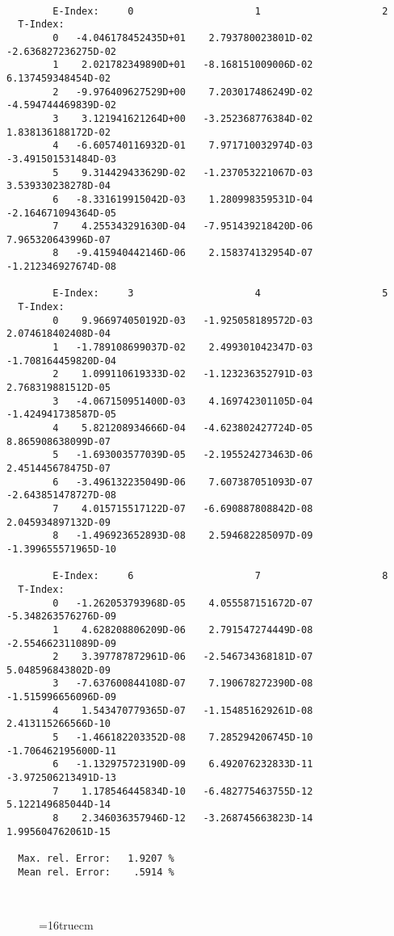 \documentclass[12pt]{article}
\begin{document}
\begin{small}\begin{verbatim}

        E-Index:     0                     1                     2
  T-Index:
        0   -4.046178452435D+01    2.793780023801D-02   -2.636827236275D-02
        1    2.021782349890D+01   -8.168151009006D-02    6.137459348454D-02
        2   -9.976409627529D+00    7.203017486249D-02   -4.594744469839D-02
        3    3.121941621264D+00   -3.252368776384D-02    1.838136188172D-02
        4   -6.605740116932D-01    7.971710032974D-03   -3.491501531484D-03
        5    9.314429433629D-02   -1.237053221067D-03    3.539330238278D-04
        6   -8.331619915042D-03    1.280998359531D-04   -2.164671094364D-05
        7    4.255343291630D-04   -7.951439218420D-06    7.965320643996D-07
        8   -9.415940442146D-06    2.158374132954D-07   -1.212346927674D-08

        E-Index:     3                     4                     5
  T-Index:
        0    9.966974050192D-03   -1.925058189572D-03    2.074618402408D-04
        1   -1.789108699037D-02    2.499301042347D-03   -1.708164459820D-04
        2    1.099110619333D-02   -1.123236352791D-03    2.768319881512D-05
        3   -4.067150951400D-03    4.169742301105D-04   -1.424941738587D-05
        4    5.821208934666D-04   -4.623802427724D-05    8.865908638099D-07
        5   -1.693003577039D-05   -2.195524273463D-06    2.451445678475D-07
        6   -3.496132235049D-06    7.607387051093D-07   -2.643851478727D-08
        7    4.015715517122D-07   -6.690887808842D-08    2.045934897132D-09
        8   -1.496923652893D-08    2.594682285097D-09   -1.399655571965D-10

        E-Index:     6                     7                     8
  T-Index:
        0   -1.262053793968D-05    4.055587151672D-07   -5.348263576276D-09
        1    4.628208806209D-06    2.791547274449D-08   -2.554662311089D-09
        2    3.397787872961D-06   -2.546734368181D-07    5.048596843802D-09
        3   -7.637600844108D-07    7.190678272390D-08   -1.515996656096D-09
        4    1.543470779365D-07   -1.154851629261D-08    2.413115266566D-10
        5   -1.466182203352D-08    7.285294206745D-10   -1.706462195600D-11
        6   -1.132975723190D-09    6.492076232833D-11   -3.972506213491D-13
        7    1.178546445834D-10   -6.482775463755D-12    5.122149685044D-14
        8    2.346036357946D-12   -3.268745663823D-14    1.995604762061D-15

  Max. rel. Error:   1.9207 %
  Mean rel. Error:    .5914 %



\end{verbatim}\end{small}
\begin{figure} \label{2.3.9c}
\epsfxsize=16truecm
\end{figure}
\newpage
\end{document}
